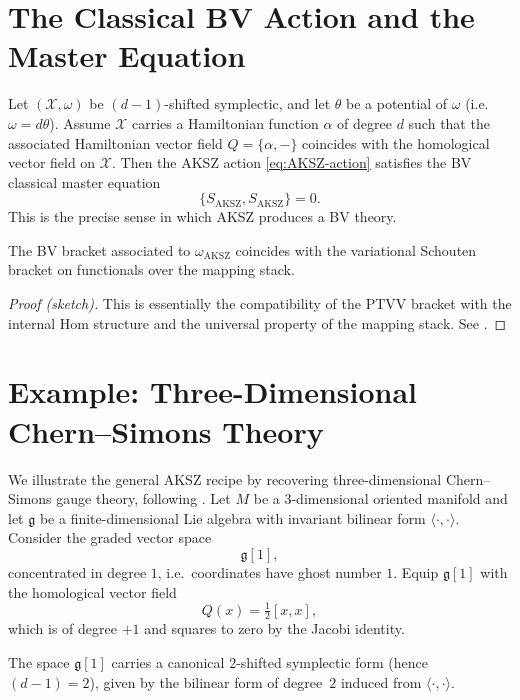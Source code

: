 \section{The Classical BV Action and the Master Equation}

Let $(\mathcal{X},\omega)$ be $(d-1)$-shifted symplectic, and let
$\theta$ be a potential of $\omega$ (i.e.\ $\omega = d\theta$).
Assume $\mathcal{X}$ carries a Hamiltonian function $\alpha$ of degree
$d$ such that the associated Hamiltonian vector field $Q=\{\alpha,-\}$
coincides with the homological vector field on $\mathcal{X}$. Then
the AKSZ action \eqref{eq:AKSZ-action} satisfies the BV classical
master equation
\[
\{S_{\mathrm{AKSZ}},S_{\mathrm{AKSZ}}\} = 0.
\]
This is the precise sense in which AKSZ produces a BV theory.

\begin{proposition}
The BV bracket associated to $\omega_{\mathrm{AKSZ}}$ coincides with
the variational Schouten bracket on functionals over the mapping stack.
\end{proposition}

\begin{proof}[Proof (sketch)]
This is essentially the compatibility of the PTVV bracket with the internal
Hom structure and the universal property of the mapping stack. See
\cite{PTVV13,CF07}.
\end{proof}


\section{Example: Three-Dimensional Chern--Simons Theory}

We illustrate the general AKSZ recipe by recovering three-dimensional
Chern--Simons gauge theory, following \cite{AKSZ97,CF01,CF07}.
Let $M$ be a $3$-dimensional oriented manifold and let
$\mathfrak{g}$ be a finite-dimensional Lie algebra with invariant bilinear
form $\langle\cdot,\cdot\rangle$. Consider the graded vector space
\[
\mathfrak{g}[1],
\]
concentrated in degree $1$, i.e.\ coordinates have ghost number $1$.
Equip $\mathfrak{g}[1]$ with the homological vector field
\[
Q(x) = \tfrac12 [x,x],
\]
which is of degree $+1$ and squares to zero by the Jacobi identity.

\begin{proposition}
The space $\mathfrak{g}[1]$ carries a canonical
$2$-shifted symplectic form (hence $(d-1)=2$), given by the bilinear form
of degree~$2$ induced from $\langle\cdot,\cdot\rangle$.
\end{proposition}

